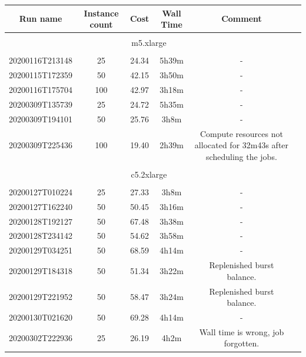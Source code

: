 \documentclass[a4paper, 10pt, conference]{ieeeconf}
\begin{document}
\begin{table}[t]
\centering
    \begin{tabular}{c c c c c c }
    Run name  & Instance count & Cost & Wall Time & Comment \\
    \hline \\
    \multicolumn{5}{c}{m5.xlarge} \\
    \hline \\
    \rowcolor{lightgray}
    20200116T213148  & 25  & 24.34  & 5h39m & - \\
    \rowcolor{lightgray}                        
    20200115T172359  & 50  & 42.15  & 3h50m & - \\
    \rowcolor{lightgray}                        
    20200116T175704  & 100 & 42.97  & 3h18m & - \\
    20200309T135739  & 25  & 24.72  & 5h35m & - \\
    20200309T194101  & 50  & 25.76  & 3h8m  & - \\
    20200309T225436  & 100 & 19.40  & 2h39m & Compute resources not allocated for 32m43s after scheduling the jobs.\\
    \hline \\                                                 
    \multicolumn{5}{c}{c5.2xlarge} \\
    \hline \\
    \rowcolor{lightgray}                                        
    20200127T010224  & 25  & 27.33  & 3h8m  & - \\
    \rowcolor{lightgray}                         
    20200127T162240  & 50  & 50.45  & 3h16m & - \\
    \rowcolor{lightgray}                         
    20200128T192127  & 50  & 67.48  & 3h38m & - \\
    \rowcolor{lightgray}                         
    20200128T234142  & 50  & 54.62  & 3h58m & - \\
    \rowcolor{lightgray}                         
    20200129T034251  & 50  & 68.59  & 4h14m & - \\
    \rowcolor{lightgray}                         
    20200129T184318  & 50  & 51.34  & 3h22m & Replenished burst balance. \\
    \rowcolor{lightgray}                         
    20200129T221952  & 50  & 58.47  & 3h24m & Replenished burst balance.  \\
    \rowcolor{lightgray}                        
    20200130T021620  & 50  & 69.28  & 4h14m &  -  \\
    20200302T222936  & 25  & 26.19  & 4h2m  & Wall time is wrong, job forgotten. \\

\end{tabular}
\end{table}
\end{document}
